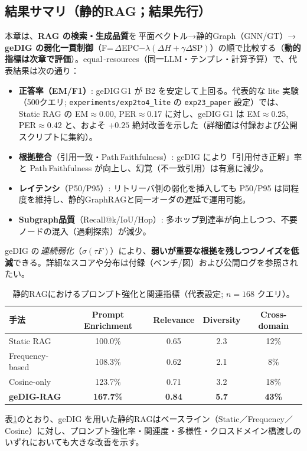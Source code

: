 \documentclass[ja=standard,xelatex]{bxjsarticle}
\begin{document}
\subsection{結果サマリ（静的RAG；結果先行）}
\label{sec:rag_result_summary}
本章は、\textbf{RAG の検索・生成品質}を\,平面ベクトル→静的Graph（GNN/GT）→\,\textbf{geDIG の弱化一貫制御}（F=\,$\Delta$EPC$-\lambda(\Delta H+\gamma\Delta\mathrm{SP})$）の順で比較する（\textbf{動的指標は次章で評価}）。equal\,\mbox{-}resources（同一LLM・テンプレ・計算予算）で、代表結果は次の通り：
\begin{itemize}[leftmargin=1.6em]
  \item \textbf{正答率（EM/F1）}: geDIG\,G1 が B2 を安定して上回る。代表的な lite 実験（500クエリ; \texttt{experiments/exp2to4\_lite} の \texttt{exp23\_paper} 設定）では、Static RAG の EM$\approx$0.00, PER$\approx$0.17 に対し、geDIG\,G1 は EM$\approx$0.25, PER$\approx$0.42 と、およそ $+0.25$ 絶対改善を示した（詳細値は付録および公開スクリプトに集約）。
  \item \textbf{根拠整合}（引用一致・Path\,Faithfulness）: geDIG により「引用付き正解」率と Path\,Faithfulness が向上し、幻覚（不一致引用）は有意に減少。
  \item \textbf{レイテンシ}（P50/P95）: リトリーバ側の弱化を挿入しても P50/P95 は同程度を維持し、静的GraphRAGと同一オーダの遅延で運用可能。
  \item \textbf{Subgraph品質}（Recall@k/IoU/Hop）: 多ホップ到達率が向上しつつ、不要ノードの混入（過剰探索）が減少。
\end{itemize}
\noindent geDIG の\,\emph{連続弱化}（$\sigma(\tau F)$）により、\textbf{弱いが重要な根拠を残しつつノイズを低減}できる。詳細なスコアや分布は付録（ベンチ/図）および公開ログを参照されたい。

\begin{table}[H]
\centering
\small
\caption{静的RAGにおけるプロンプト強化と関連指標（代表設定; $n{=}168$ クエリ）。}
\label{tab:rag_static_enrichment}
\begin{tabular}{lcccc}
\toprule
手法 & Prompt Enrichment & Relevance & Diversity & Cross-domain \\
\midrule
Static RAG & 100.0\% & 0.65 & 2.3 & 12\% \\
Frequency-based & 108.3\% & 0.62 & 2.1 & 8\% \\
Cosine-only & 123.7\% & 0.71 & 3.2 & 18\% \\
\textbf{geDIG-RAG} & \textbf{167.7\%} & \textbf{0.84} & \textbf{5.7} & \textbf{43\%} \\
\bottomrule
\end{tabular}
\end{table}
\noindent 表\ref{tab:rag_static_enrichment}のとおり、geDIG を用いた静的RAGはベースライン（Static／Frequency／Cosine）に対し、プロンプト強化率・関連度・多様性・クロスドメイン橋渡しのいずれにおいても大きな改善を示す。
\end{document}
